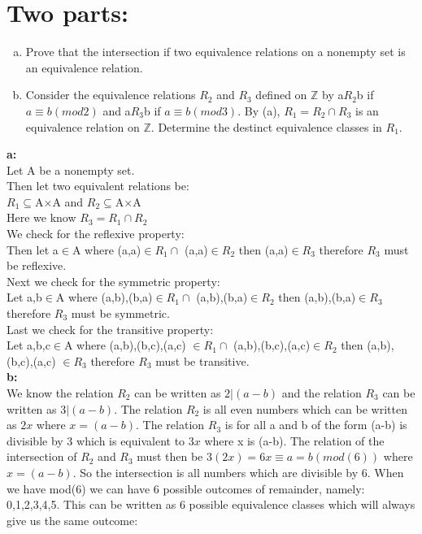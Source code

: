 \section{Two parts:}
\begin{enumerate}[a.]
\item Prove that the intersection if two equivalence relations on a nonempty set is an equivalence relation.
\item Consider the equivalence relations $R_2$ and $R_3$ defined on $\mathbb{Z}$ by a$R_2$b if $a\equiv b(mod 2)$ and a$R_3$b if $a\equiv b(mod 3)$. By (a), $R_1=R_2\cap R_3$ is an equivalence relation on $\mathbb{Z}$. Determine the destinct equivalence classes in $R_1$.
\end{enumerate}
\textbf{a:}\\
Let A be a nonempty set.\\
Then let two equivalent relations be:\\
$R_1\subseteq $A$\times$A and $R_2\subseteq $A$\times$A\\
Here we know $R_3=R_1 \cap R_2$\\
We check for the reflexive property:\\
Then let a$\in$A where (a,a)$\in R_1 \cap$ (a,a)$\in R_2$ then (a,a)$\in R_3$ therefore $R_3$ must be reflexive.\\
Next we check for the symmetric property:\\
Let a,b$\in$A where (a,b),(b,a)$\in R_1 \cap$ (a,b),(b,a)$\in R_2$ then (a,b),(b,a)$\in R_3$ therefore $R_3$ must be symmetric.\\
Last we check for the transitive property:\\
Let a,b,c$\in$A where (a,b),(b,c),(a,c) $\in R_1 \cap$ (a,b),(b,c),(a,c)$\in R_2$ then (a,b),(b,c),(a,c) $\in R_3$ therefore $R_3$ must be transitive.\\
\textbf{b:}\\
We know the relation $R_2$ can be written as $2|(a-b)$ and the relation $R_3$ can be written as $3|(a-b)$. The relation $R_2$ is all even numbers which can be written as $2x$ where $x=(a-b)$. The relation $R_3$ is for all a and b of the form (a-b) is divisible by 3 which is equivalent to $3x$ where x is (a-b). The relation of the intersection of $R_2$ and $R_3$ must then be $3(2x)=6x\equiv a=b(mod(6))$ where $x=(a-b)$. So the intersection is all numbers which are divisible by 6.
When we have mod(6) we can have 6 possible outcomes of remainder, namely: 0,1,2,3,4,5. This can be written as 6 possible equivalence classes which will always give us the same outcome:
